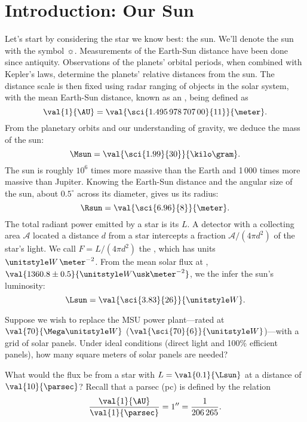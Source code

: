 
\section{Introduction: Our Sun}

Let's start by considering the star we know best: the sun.  We'll denote the sun with the symbol $\sun$. Measurements of the Earth-Sun distance have been done since antiquity. Observations of the planets' orbital periods, when combined with Kepler's laws, determine the planets' relative distances from the sun. The distance scale is then fixed using radar ranging of objects in the solar system, with the mean Earth-Sun distance, known as an , being defined as\cite{Luzum2011The-IAU-2009-sy}
\[
	\val{1}{\AU} = \val{\sci{1.495\,978\,707\,00}{11}}{\meter}.
\]
From the planetary orbits and our understanding of gravity, we deduce the mass of the sun:
\[
	\Msun = \val{\sci{1.99}{30}}{\kilo\gram}.
\]
The sun is roughly $10^{6}$ times more massive than the Earth and 1\,000 times more massive than Jupiter. Knowing the Earth-Sun distance and the angular size of the sun, about $0.5^{\circ}$ across its diameter, gives us its radius:
\[
	\Rsun = \val{\sci{6.96}{8}}{\meter}.
\]
The total radiant power emitted by a star is its
 $L$. A detector with a collecting area $\mathcal{A}$ located a distance $d$ from a star intercepts a fraction $\mathcal{A}/(4\pi d^{2})$ of the star's light.  We call $F = L/(4\pi d^{2})$ the , which has units $\watt\,\meter^{-2}$. From the mean solar flux\cite{Kopp2011A-new-lower-val} at , $\val{1360.8\pm0.5}{\watt\usk\meter^{-2}}$, we the infer the sun's luminosity:
\[
	\Lsun = \val{\sci{3.83}{26}}{\watt}.
\]

\begin{exercisebox}
Suppose we wish to replace the MSU power plant---rated at $\val{70}{\Mega\watt}$ ($\val{\sci{70}{6}}{\watt}$)---with a grid of solar panels. Under ideal conditions (direct light and 100\% efficient panels), how many square meters of solar panels are needed?
\end{exercisebox}

\begin{exercisebox}
What would the flux be from a star with $L = \val{0.1}{\Lsun}$ at a distance of $\val{10}{\parsec}$?
Recall that a parsec (pc) is defined by the relation
\[
	\frac{\val{1}{\AU}}{\val{1}{\parsec}} = 1'' = \frac{1}{206\,265}.
\]
\end{exercisebox}

